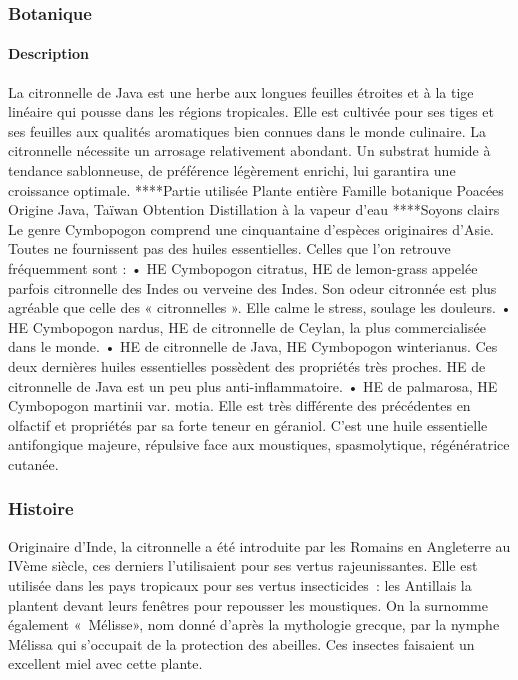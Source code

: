 \documentclass[12pt,a4wide]{article}
\begin{document}
\subsubsection{Botanique}
\label{sec-4-4-3}


\paragraph{Description}
\label{sec-4-4-3-1}
La citronnelle de Java est une herbe aux longues feuilles étroites et à la tige linéaire qui pousse dans les régions tropicales. Elle est cultivée pour ses tiges et ses feuilles aux qualités aromatiques bien connues dans le monde culinaire. La citronnelle nécessite un arrosage relativement abondant. Un substrat humide à tendance sablonneuse, de préférence légèrement enrichi, lui garantira une croissance optimale.
****Partie utilisée
Plante entière
Famille botanique
Poacées
Origine
Java, Taïwan
Obtention
Distillation à la vapeur d'eau
****Soyons clairs
Le genre Cymbopogon comprend une cinquantaine d'espèces originaires d'Asie.
Toutes ne fournissent pas des huiles essentielles. Celles que l'on retrouve fréquemment sont :
    • HE Cymbopogon citratus, HE de lemon-grass appelée parfois citronnelle des Indes ou verveine des Indes. Son odeur citronnée est plus agréable que celle des « citronnelles ». Elle calme le stress, soulage les douleurs.
    • HE Cymbopogon nardus, HE de citronnelle de Ceylan, la plus commercialisée dans le monde.
    • HE de citronnelle de Java, HE Cymbopogon winterianus.
Ces deux dernières huiles essentielles possèdent des propriétés très proches. HE de citronnelle de Java est un peu plus anti-inflammatoire.
    • HE de palmarosa, HE Cymbopogon martinii var. motia. Elle est très différente des précédentes en olfactif et propriétés par sa forte teneur en géraniol. C'est une huile essentielle antifongique majeure, répulsive face aux moustiques, spasmolytique, régénératrice cutanée.

\subsubsection{Histoire}
\label{sec-4-4-4}
Originaire d'Inde, la citronnelle a été introduite par les Romains en Angleterre au IVème siècle, ces derniers l'utilisaient pour ses vertus rajeunissantes.
Elle est utilisée dans les pays tropicaux pour ses vertus insecticides : les Antillais la plantent devant leurs fenêtres pour repousser les moustiques. On la surnomme également « Mélisse», nom donné d'après la mythologie grecque, par la nymphe Mélissa qui s'occupait de la protection des abeilles. Ces insectes faisaient un excellent miel avec cette plante.
\end{document}
